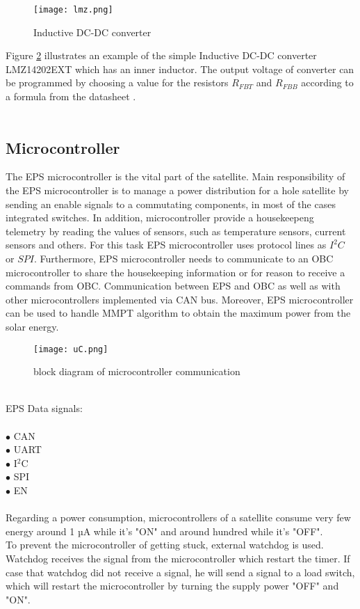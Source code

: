 \begin{figure}[h]
	\centering
	\texttt{[image: lmz.png]}
	\caption{ Inductive DC-DC converter \cite{19}}
	\label{fig: EPS4}
\end{figure}

Figure \ref{fig: EPS4} illustrates an example of the simple Inductive DC-DC converter LMZ14202EXT which has an inner inductor. The output voltage of converter can be programmed by choosing a value for the resistors $R_{FBT}$ and $R_{FBB}$ according to a formula from the datasheet \cite{19}. 
\\
\\

\subsection{Microcontroller \label{sec:tech}}
The EPS microcontroller is the vital part of the satellite. Main responsibility of the EPS microcontroller is to manage a power distribution for a hole satellite by sending an enable signals to a commutating components, in most of the cases integrated switches. In addition, microcontroller provide a housekeepeng telemetry by reading the values of sensors, such as temperature sensors, current sensors and others. For this task EPS microcontroller uses protocol lines as $I^{2}C$ or $SPI$. Furthermore, EPS microcontroller needs to communicate to an OBC microcontroller to share the housekeeping information or for reason to receive a commands from OBC. Communication between EPS and OBC as well as with other microcontrollers implemented via CAN bus. Moreover, EPS microcontroller can be used to handle MMPT algorithm to obtain the maximum power from the solar energy.
\\
\begin{figure}[h]
	\centering
	\texttt{[image: uC.png]}
	\caption{block diagram of microcontroller communication}
	\label{fig: EPS4}
\end{figure}
\\
EPS Data signals:\\ \\
$\bullet$ CAN\\
$\bullet$ UART\\
$\bullet$ I$^{2}$C\\
$\bullet$  SPI\\
$\bullet$  EN\\
\\
Regarding a power consumption, microcontrollers of a satellite consume very few energy around 1 µA while it's "ON" and around hundred while it's "OFF".\\
To prevent the microcontroller of getting stuck, external watchdog is used. Watchdog receives the signal from the microcontroller which restart the timer. If case that watchdog did not receive a signal, he will send a signal to a load switch, which will restart the microcontroller by turning the supply power "OFF" and "ON".

